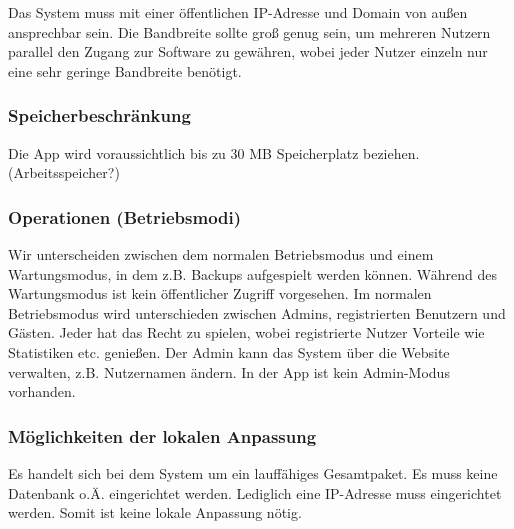 \documentclass[fontsize=12pt,paper=a4,twoside]{scrartcl}
\begin{document}
Das System muss mit einer öffentlichen IP-Adresse und Domain von außen ansprechbar sein. Die Bandbreite sollte groß genug sein, um mehreren Nutzern parallel den Zugang zur Software zu gewähren, wobei jeder Nutzer einzeln nur eine sehr geringe Bandbreite benötigt.

\subsubsection{Speicherbeschränkung}


Die App wird voraussichtlich bis zu 30 MB Speicherplatz beziehen. (Arbeitsspeicher?)


\subsubsection{Operationen (Betriebsmodi)}

Wir unterscheiden zwischen dem normalen Betriebsmodus und einem Wartungsmodus, in dem z.B. Backups aufgespielt werden können. Während des Wartungsmodus ist kein öffentlicher Zugriff vorgesehen. Im normalen Betriebsmodus wird unterschieden zwischen Admins, registrierten Benutzern und Gästen. Jeder hat das Recht zu spielen, wobei registrierte Nutzer Vorteile wie Statistiken etc. genießen. Der Admin kann das System über die Website verwalten, z.B. Nutzernamen ändern. In der App ist kein Admin-Modus vorhanden.

\subsubsection{Möglichkeiten der lokalen Anpassung}
  
Es handelt sich bei dem System um ein lauffähiges Gesamtpaket. Es muss keine Datenbank o.Ä. eingerichtet werden. Lediglich eine IP-Adresse muss eingerichtet werden. Somit ist keine lokale Anpassung nötig.
\end{document}
